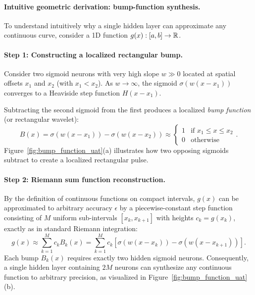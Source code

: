 \documentclass[../../main.tex]{subfiles}
\begin{document}
\paragraph{Intuitive geometric derivation: bump-function synthesis.}
To understand intuitively why a single hidden layer can approximate any continuous curve, consider a 1D function $g(x): [a, b] \to \mathbb{R}$.

\paragraph{Step 1: Constructing a localized rectangular bump.}
Consider two sigmoid neurons with very high slope $w \gg 0$ located at spatial offsets $x_1$ and $x_2$ (with $x_1 < x_2$). As $w \to \infty$, the sigmoid $\sigma(w(x - x_1))$ converges to a Heaviside step function $H(x - x_1)$. 

Subtracting the second sigmoid from the first produces a localized \emph{bump function} (or rectangular wavelet):
\begin{equation}
\label{eq:bump_construction}
B(x) = \sigma(w(x - x_1)) - \sigma(w(x - x_2)) \approx \begin{cases} 1 & \text{if } x_1 \le x \le x_2 \\ 0 & \text{otherwise} \end{cases}.
\end{equation}
Figure~\ref{fig:bump_function_uat}(a) illustrates how two opposing sigmoids subtract to create a localized rectangular pulse.

\paragraph{Step 2: Riemann sum function reconstruction.}
By the definition of continuous functions on compact intervals, $g(x)$ can be approximated to arbitrary accuracy $\epsilon$ by a piecewise-constant step function consisting of $M$ uniform sub-intervals $[x_k, x_{k+1}]$ with heights $c_k = g(x_k)$, exactly as in standard Riemann integration:
\begin{equation}
\label{eq:riemann_uat}
g(x) \approx \sum_{k=1}^M c_k B_k(x) = \sum_{k=1}^M c_k \left[ \sigma(w(x - x_k)) - \sigma(w(x - x_{k+1})) \right].
\end{equation}
Each bump $B_k(x)$ requires exactly two hidden sigmoid neurons. Consequently, a single hidden layer containing $2M$ neurons can synthesize any continuous function to arbitrary precision, as visualized in Figure~\ref{fig:bump_function_uat}(b).
\end{document}

